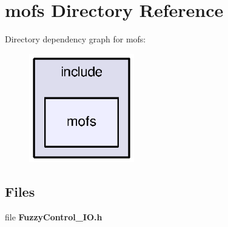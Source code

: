 \section{mofs Directory Reference}
\label{dir_f833e1c85fdbcdcf442a2b89ae6adfad}
Directory dependency graph for mofs\-:\nopagebreak
\begin{figure}[H]
\begin{center}
\leavevmode
\includegraphics[width=130pt]{dir_f833e1c85fdbcdcf442a2b89ae6adfad_dep}
\end{center}
\end{figure}
\subsection*{Files}
\begin{DoxyCompactItemize}
\item 
file {\bf Fuzzy\-Control\-\_\-\-I\-O.\-h}
\end{DoxyCompactItemize}
